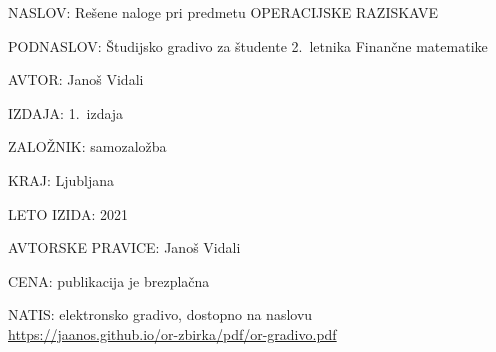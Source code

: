 \begin{description}
\itemsep -2pt
\item{NASLOV:} Rešene naloge pri predmetu OPERACIJSKE RAZISKAVE
\item{PODNASLOV:} Študijsko gradivo za študente 2.~letnika Finančne matematike
\item{AVTOR:} Janoš Vidali
\item{IZDAJA:} 1.~izdaja
\item{ZALOŽNIK:} samozaložba
\item{KRAJ:} Ljubljana
\item{LETO IZIDA:} 2021
\item{AVTORSKE PRAVICE:} Janoš Vidali
\item{CENA:} publikacija je brezplačna
\item{NATIS:} elektronsko gradivo, dostopno na naslovu \\ \url{https://jaanos.github.io/or-zbirka/pdf/or-gradivo.pdf}
\end{description}
